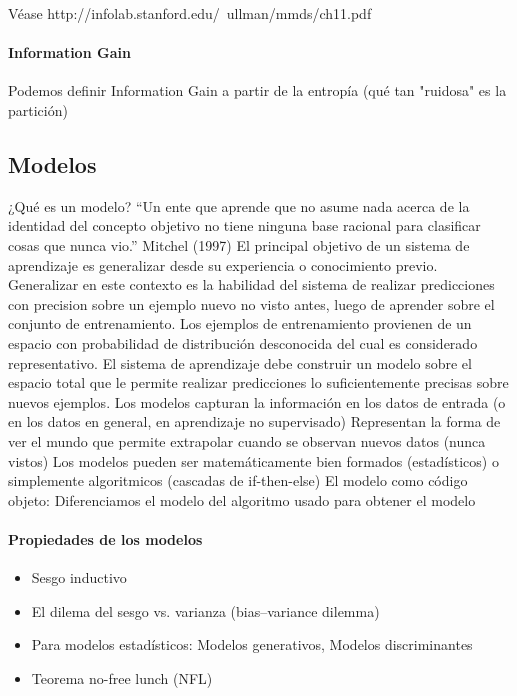 \documentclass[a4paper,12pt,spanish]{book}
\begin{document}
	Véase http://infolab.stanford.edu/~ullman/mmds/ch11.pdf


	\paragraph{Information Gain}
	  Podemos definir Information Gain a partir de la entropía (qué tan "ruidosa" es la partición)

      \subsection{Modelos}

	¿Qué es un modelo?
	“Un ente que aprende que no asume nada acerca de la identidad del concepto objetivo no tiene ninguna base racional para clasificar cosas que nunca vio.”
	Mitchel (1997)
	El principal objetivo de un sistema de aprendizaje es generalizar desde su experiencia o conocimiento previo. Generalizar en este contexto es la habilidad del sistema de realizar
	predicciones con precision sobre un ejemplo nuevo no visto antes, luego de aprender sobre el conjunto de entrenamiento. Los ejemplos de entrenamiento provienen de un espacio 
	con probabilidad de distribución desconocida del cual es considerado representativo. El sistema de aprendizaje debe construir un modelo sobre el espacio total que le permite realizar
	predicciones lo suficientemente precisas sobre nuevos ejemplos.
	Los modelos capturan la información en los datos de entrada (o en los datos en general, en aprendizaje no supervisado)
	Representan la forma de ver el mundo que permite extrapolar cuando se observan nuevos datos (nunca vistos)
	Los modelos pueden ser matemáticamente bien formados (estadísticos) o simplemente algoritmicos (cascadas de if-then-else)
	El modelo como código objeto: Diferenciamos el modelo del algoritmo usado para obtener el modelo

	\paragraph{Propiedades de los modelos}
	  \begin{itemize}
	    \item Sesgo inductivo
	    \item El dilema del sesgo vs. varianza (bias–variance dilemma)
	    \item Para modelos estadísticos: Modelos generativos, Modelos discriminantes
	    \item Teorema no-free lunch (NFL)
	  \end{itemize}
\end{document}
